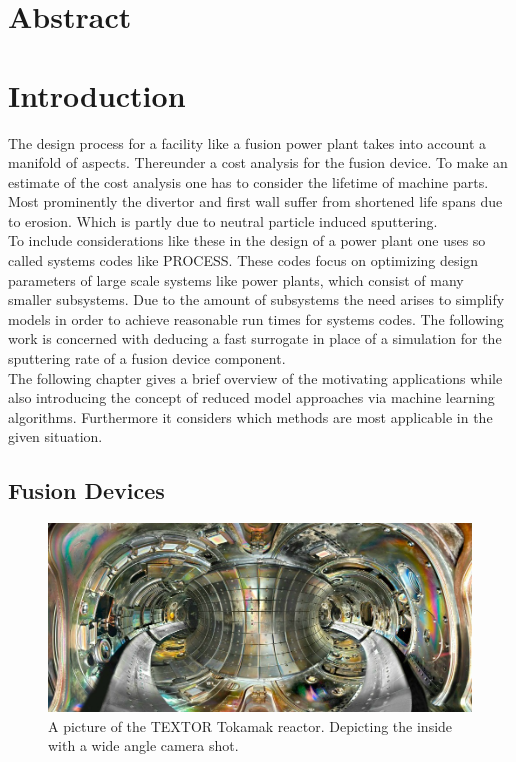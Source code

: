 \chapter*{Abstract}

\chapter{Introduction}
	The design process for a facility like a fusion power plant takes into account a manifold of aspects. Thereunder a cost analysis for the fusion device. To make an estimate of the cost analysis one has to consider the lifetime of machine parts. Most prominently the divertor and first wall suffer from shortened life spans due to erosion. Which is partly due to neutral particle induced sputtering.\\
	To include considerations like these in the design of a power plant one uses so called systems codes like PROCESS\cite{process}. These codes focus on optimizing design parameters of large scale systems like power plants, which consist of many smaller subsystems. Due to the amount of subsystems the need arises to simplify models in order to achieve reasonable run times for systems codes. The following work is concerned with deducing a fast surrogate in place of a simulation for the sputtering rate of a fusion device component.\\
	The following chapter gives a brief overview of the motivating applications while also introducing the concept of reduced model approaches via machine learning algorithms. Furthermore it considers which methods are most applicable in the given situation.\\
	
	\section{Fusion Devices}
	
	\begin{figure}[ht]
	\includegraphics[width=\textwidth]{images/TEXTOR_tokamak_narrow.jpg}
	\caption{A picture of the TEXTOR Tokamak reactor. Depicting the inside with a wide angle camera shot.}
	\label{TEXTOR_JPG}
	\end{figure}
	
